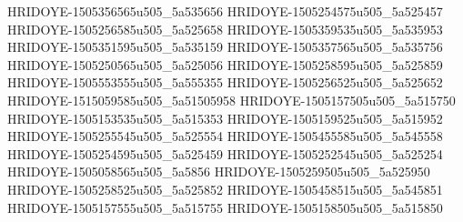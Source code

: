 HRIDOYE-1505356565u505_5a535656
HRIDOYE-1505254575u505_5a525457
HRIDOYE-1505256585u505_5a525658
HRIDOYE-1505359535u505_5a535953
HRIDOYE-1505351595u505_5a535159
HRIDOYE-1505357565u505_5a535756
HRIDOYE-1505250565u505_5a525056
HRIDOYE-1505258595u505_5a525859
HRIDOYE-1505553555u505_5a555355
HRIDOYE-1505256525u505_5a525652
HRIDOYE-1515059585u505_5a51505958
HRIDOYE-1505157505u505_5a515750
HRIDOYE-1505153535u505_5a515353
HRIDOYE-1505159525u505_5a515952
HRIDOYE-1505255545u505_5a525554
HRIDOYE-1505455585u505_5a545558
HRIDOYE-1505254595u505_5a525459
HRIDOYE-1505252545u505_5a525254
HRIDOYE-1505058565u505_5a5856
HRIDOYE-1505259505u505_5a525950
HRIDOYE-1505258525u505_5a525852
HRIDOYE-1505458515u505_5a545851
HRIDOYE-1505157555u505_5a515755
HRIDOYE-1505158505u505_5a515850

